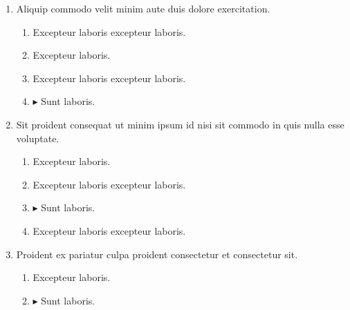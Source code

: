 \documentclass[a4paper,12pt]{article}
\begin{document}
\begin{enumerate}[label=\textbf{\arabic*.}]
\begin{multicols}{2}
\begin{enumerate}
		\item  Excepteur laboris.
    
		\item  Excepteur laboris excepteur laboris.
    
	\end{enumerate}

\end{multicols}
\item Aliquip commodo velit minim aute duis dolore exercitation.
\begin{multicols}{2}
	\begin{enumerate}
		\item  Excepteur laboris excepteur laboris.
    
		\item  Excepteur laboris.
    
		\item  Excepteur laboris excepteur laboris.
  
		\item $\blacktriangleright$  Sunt laboris.
    
	\end{enumerate}

\end{multicols}
\item Sit proident consequat ut minim ipsum id nisi sit commodo in quis nulla esse voluptate.
\begin{multicols}{2}
	\begin{enumerate}
		\item  Excepteur laboris.
    
		\item  Excepteur laboris excepteur laboris.
    
		\item $\blacktriangleright$  Sunt laboris.
    
		\item  Excepteur laboris excepteur laboris.
  
	\end{enumerate}

\end{multicols}
\item Proident ex pariatur culpa proident consectetur et consectetur sit.
\begin{multicols}{2}
	\begin{enumerate}
		\item  Excepteur laboris.
    
		\item $\blacktriangleright$  Sunt laboris.
    

\end{enumerate}
\end{multicols}
\end{enumerate}
\end{document}

